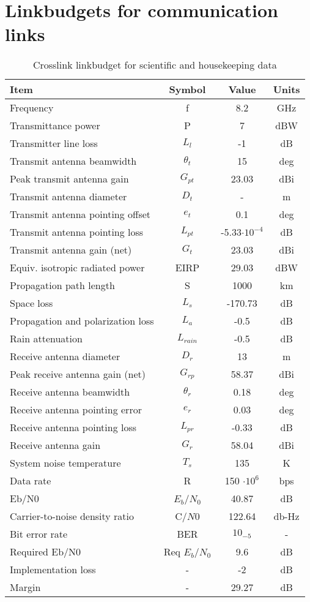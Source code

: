 \documentclass[11pt]{report}
\begin{document}
\chapter{Linkbudgets for communication links}
\label{linkbudgets}

\begin{table}[ht]
\centering
\begin{tabular}{l | c | c | c }
Item & Symbol & Value & Units \\ \hline
Frequency	& f	& 8.2	& GHz \\
Transmittance power	& P	& 7	& dBW \\
Transmitter line loss	& $L_{l}$	& -1	& dB \\
Transmit antenna beamwidth	& $\theta_{t}$	& 15	& deg \\
Peak transmit antenna gain	& $G_{pt}$	& 23.03	& dBi \\
Transmit antenna diameter	& $D_{t}$	& -	& m \\
Transmit antenna pointing offset	& $e_{t}$	& 0.1	& deg \\
Transmit antenna pointing loss	& $L_{pt}$ & -5.33$\cdot 10^{-4}$ & dB \\
Transmit antenna gain (net)	& $G_{t}$	& 23.03	& dBi \\
Equiv. isotropic radiated power	& EIRP	& 29.03	& dBW \\
Propagation path length	& S	& 1000	& km \\
Space loss	& $L_{s}$	& -170.73	& dB \\
Propagation and polarization loss & $L_{a}$ & -0.5 & dB \\
Rain attenuation	& $L_{rain}$	& -0.5	& dB \\
Receive antenna diameter	& $D_{r}$	& 13	& m \\
Peak receive antenna gain (net)	& $G_{rp}$	& 58.37	& dBi \\
Receive antenna beamwidth	& $\theta_{r}$	& 0.18	& deg \\
Receive antenna pointing error	& $e_{r}$	& 0.03	& deg \\
Receive antenna pointing loss	& $L_{pr}$	& -0.33	& dB \\
Receive antenna gain	& $G_{r}$	& 58.04	& dBi \\
System noise temperature	& $T_{s}$	& 135	& K \\
Data rate	& R	& 150 $\cdot10^{6}$	& bps \\
Eb/N0	& $E_{b}$/$N_{0}$	& 40.87	& dB \\
Carrier-to-noise density ratio	& C/$N{0}$	& 122.64	& db-Hz \\
Bit error rate	& BER	& $10_{-5}$	& - \\
Required Eb/N0	& Req $E_{b}$/$N_{0}$	& 9.6	& dB \\
Implementation loss &	-	& -2	& dB \\
Margin	& -	& 29.27	& dB \\
\end{tabular}
\caption{Crosslink linkbudget for scientific and housekeeping data}
\label{figSSbudget}
\end{table}
\end{document}
